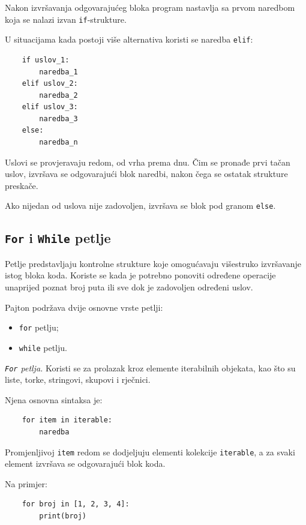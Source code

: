 Nakon izvršavanja odgovarajućeg bloka program nastavlja sa prvom naredbom koja se nalazi izvan \texttt{if}-strukture.

U situacijama kada postoji više alternativa koristi se naredba \texttt{elif}:

\begin{verbatim}
	if uslov_1:
	    naredba_1
	elif uslov_2:
	    naredba_2
	elif uslov_3:
	    naredba_3
	else:
	    naredba_n
\end{verbatim}

Uslovi se provjeravaju redom, od vrha prema dnu. Čim se pronađe prvi tačan uslov, izvršava se odgovarajući blok naredbi, nakon čega se ostatak strukture preskače.

Ako nijedan od uslova nije zadovoljen, izvršava se blok pod granom \texttt{else}.

\subsection{\texttt{For} i \texttt{While} petlje}

Petlje predstavljaju kontrolne strukture koje omogućavaju višestruko izvršavanje istog bloka koda. Koriste se kada je potrebno ponoviti određene operacije unaprijed poznat broj puta ili sve dok je zadovoljen određeni uslov.

Pajton podržava dvije osnovne vrste petlji:

\begin{itemize}
	\item \texttt{for} petlju;
	\item \texttt{while} petlju.
\end{itemize}

\textit{\texttt{For} petlja.}  Koristi se za prolazak kroz elemente iterabilnih objekata, kao što su liste, torke, stringovi, skupovi i rječnici.

Njena osnovna sintaksa je:

\begin{verbatim}
	for item in iterable:
	    naredba
\end{verbatim}

Promjenljivoj \texttt{item} redom se dodjeljuju elementi kolekcije \texttt{iterable}, a za svaki element izvršava se odgovarajući blok koda.

Na primjer:

\begin{verbatim}
	for broj in [1, 2, 3, 4]:
	    print(broj)
\end{verbatim}

